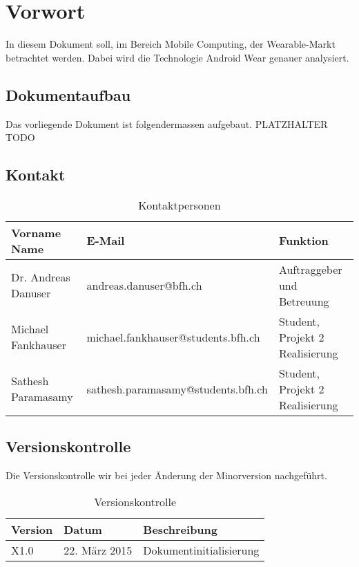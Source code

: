 \chapter*{Vorwort}
\label{chap:vorwort}

In diesem Dokument soll, im Bereich Mobile Computing, der Wearable-Markt betrachtet werden. Dabei wird die Technologie Android Wear genauer analysiert.

\section*{Dokumentaufbau}
\label{sec:vorwort_aufbau}

Das vorliegende Dokument ist folgendermassen aufgebaut. PLATZHALTER TODO


\section*{Kontakt}
\label{sec:vorwort_kontakt}

\begin{table}[H]
	\begin{tabular}{lll} \toprule
		\textbf{Vorname Name} & \textbf{E-Mail} & \textbf{Funktion} \\ \midrule
		Dr. Andreas Danuser & andreas.danuser@bfh.ch & Auftraggeber und Betreuung\\ \midrule
		Michael Fankhauser & michael.fankhauser@students.bfh.ch & Student, Projekt 2 Realisierung \\ \midrule
		Sathesh Paramasamy & sathesh.paramasamy@students.bfh.ch & Student, Projekt 2 Realisierung \\ \bottomrule
	\end{tabular}
	\caption*{Kontaktpersonen}
	\label{tab:kontaktpersonen}
\end{table}


\section*{Versionskontrolle}
\label{sec:vorwort_versionen}

Die Versionskontrolle wir bei jeder \"Anderung der Minorversion nachgeführt.

\begin{table}[H]
	\begin{tabular}{lll} \toprule
		\textbf{Version}	& \textbf{Datum}	& \textbf{Beschreibung}											\\ \midrule
		X1.0					& 22. M\"arz 2015		& Dokumentinitialisierung										\\ \bottomrule
	\end{tabular}
	\caption*{Versionskontrolle}
	\label{tab:versionen}
\end{table}